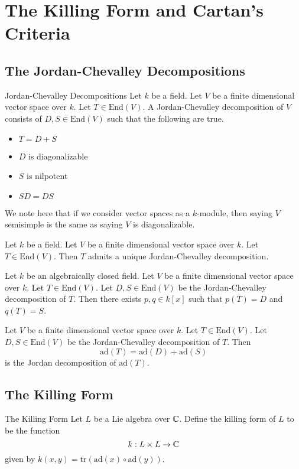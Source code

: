 \documentclass[a4paper]{article}
\begin{document}
\pagebreak
\section{The Killing Form and Cartan's Criteria}
\subsection{The Jordan-Chevalley Decompositions}
\begin{defn}{Jordan-Chevalley Decompositions}{} Let $k$ be a field. Let $V$ be a finite dimensional vector space over $k$. Let $T\in\text{End}(V)$. A Jordan-Chevalley decomposition of $V$ consists of $D,S\in\text{End}(V)$ such that the following are true. 
\begin{itemize}
\item $T=D+S$
\item $D$ is diagonalizable
\item $S$ is nilpotent
\item $SD=DS$
\end{itemize}
\end{defn}

We note here that if we consider vector spaces as a $k$-module, then saying $V$ semisimple is the same as saying $V$ is diagonalizable. 

\begin{prp}{}{} Let $k$ be a field. Let $V$ be a finite dimensional vector space over $k$. Let $T\in\text{End}(V)$. Then $T$ admits a unique Jordan-Chevalley decomposition. 
\end{prp}

\begin{prp}{}{} Let $k$ be an algebraically closed field. Let $V$ be a finite dimensional vector space over $k$. Let $T\in\text{End}(V)$. Let $D,S\in\text{End}(V)$ be the Jordan-Chevalley decomposition of $T$. Then there exists $p,q\in k[x]$ such that $p(T)=D$ and $q(T)=S$. 
\end{prp}

\begin{lmm}{}{} Let $V$ be a finite dimensional vector space over $k$. Let $T\in\text{End}(V)$. Let $D,S\in\text{End}(V)$ be the Jordan-Chevalley decomposition of $T$. Then $$\text{ad}(T)=\text{ad}(D)+\text{ad}(S)$$ is the Jordan decomposition of $\text{ad}(T)$. 
\end{lmm}

\subsection{The Killing Form}
\begin{defn}{The Killing Form}{} Let $L$ be a Lie algebra over $\mathbb{C}$. Define the killing form of $L$ to be the function $$k:L\times L\to\mathbb{C}$$ given by $k(x,y)=\text{tr}(\text{ad}(x)\circ\text{ad}(y))$. 
\end{defn}
\end{document}
